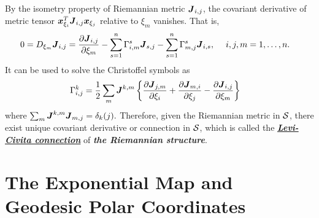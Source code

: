 \documentclass[11pt]{article}
\begin{document}
\begin{itemize}
By the isometry property of Riemannian metric $\boldsymbol{J}_{i,j}$, the covariant derivative of metric tensor $\boldsymbol{x}_{\xi_{i}}^{T}\boldsymbol{J}_{i,j}\boldsymbol{x}_{\xi_{j}}$ relative to $\xi_{m}$  vanishes. That is,
\begin{align}
0=D_{\xi_{m}}\boldsymbol{J}_{i,j} &=\frac{\partial \boldsymbol{J}_{i,j}}{ \partial \xi_{m}} - \sum_{s=1}^{n}\Gamma_{i,m}^{s}\boldsymbol{J}_{s,j}- \sum_{s=1}^{n}\Gamma_{m,j}^{s}\boldsymbol{J}_{i,s},\;\quad i,j,m=1,\ldots,n. \label{eqn: Christoffel_metric_eqn}
\end{align}
It can be used to solve the Christoffel symbols as 
\begin{align}
\Gamma_{i,j}^{k} &= \frac{1}{2}\sum_{m}\boldsymbol{J}^{k,m}\left\{\frac{\partial \boldsymbol{J}_{j,m}}{ \partial \xi_{i}}+ \frac{\partial \boldsymbol{J}_{m,i}}{ \partial \xi_{j}}  - \frac{\partial \boldsymbol{J}_{i,j}}{ \partial \xi_{m}}\right\} \label{eqn: Christoffel_metric_expr}
\end{align}
where $\sum_{m}\boldsymbol{J}^{k,m}\boldsymbol{J}_{m,j}=\delta_{k}(j).$
Therefore, given the Riemannian metric in ${\mathcal S}$, there exist unique covariant derivative or connection in ${\mathcal S}$, which is called the \underline{\emph{\textbf{Levi-Civita connection}}} of \emph{\textbf{the Riemannian structure}}.  


\end{itemize}

\section{The Exponential Map and Geodesic Polar Coordinates}
\end{document}
